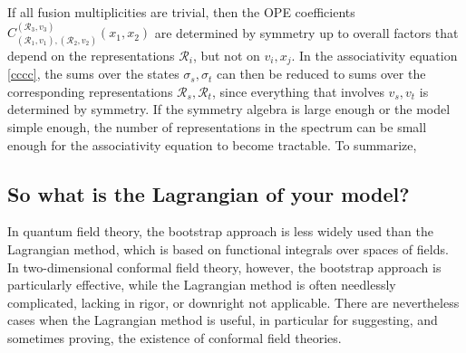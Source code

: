 \documentclass[12pt, a4paper, notitlepage, twoside]{report}
\numberwithin{equation}{section}
\theoremstyle{break}
\begin{document}
If all fusion multiplicities are trivial, then the OPE coefficients  $C_{(\mathcal{R}_1,v_1),(\mathcal{R}_2,v_2)}^{(\mathcal{R}_3,v_3)}(x_1,x_2)$ are determined by symmetry up to overall factors that depend on the representations $\mathcal{R}_i$, but not on $v_i,x_j$. In the 
associativity equation \eqref{cccc}, the sums over the states $\sigma_s,\sigma_t$  can then be reduced to sums over the corresponding representations $\mathcal{R}_s,\mathcal{R}_t$, since everything that involves $v_s,v_t$ is determined by symmetry. 
If the symmetry algebra is large enough or the model simple enough, the number of representations in the spectrum can be small enough for the associativity equation to become tractable.
To summarize,
\begin{center}
\end{center}


\subsection{So what is the Lagrangian of your model? \label{seclagr}}

In quantum field theory, the bootstrap approach is less widely used than the Lagrangian method, which is based on functional integrals over spaces of fields.
In two-dimensional conformal field theory, however, the bootstrap approach is particularly effective, while the Lagrangian method is often needlessly complicated, lacking in rigor, or downright not applicable. 
There are nevertheless cases when the Lagrangian method is useful, in particular for 
suggesting, and sometimes proving, the existence of conformal field theories. 
\end{document}
